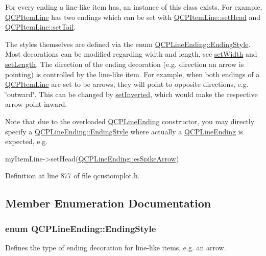  For every ending a line-\/like item has, an instance of this class exists. For example, \hyperlink{class_q_c_p_item_line}{Q\+C\+P\+Item\+Line} has two endings which can be set with \hyperlink{class_q_c_p_item_line_aebf3d687114d584e0459db6759e2c3c3}{Q\+C\+P\+Item\+Line\+::set\+Head} and \hyperlink{class_q_c_p_item_line_ac264222c3297a7efe33df9345c811a5f}{Q\+C\+P\+Item\+Line\+::set\+Tail}.

The styles themselves are defined via the enum \hyperlink{class_q_c_p_line_ending_a5ef16e6876b4b74959c7261d8d4c2cd5}{Q\+C\+P\+Line\+Ending\+::\+Ending\+Style}. Most decorations can be modified regarding width and length, see \hyperlink{class_q_c_p_line_ending_a26dc020ea985a72cc25881ce2115e34e}{set\+Width} and \hyperlink{class_q_c_p_line_ending_ae36fa01763751cd64b7f56c3507e935a}{set\+Length}. The direction of the ending decoration (e.\+g. direction an arrow is pointing) is controlled by the line-\/like item. For example, when both endings of a \hyperlink{class_q_c_p_item_line}{Q\+C\+P\+Item\+Line} are set to be arrows, they will point to opposite directions, e.\+g. \char`\"{}outward\char`\"{}. This can be changed by \hyperlink{class_q_c_p_line_ending_a580e4e2360b35ebb8d68f3494aa2335d}{set\+Inverted}, which would make the respective arrow point inward.

Note that due to the overloaded \hyperlink{class_q_c_p_line_ending}{Q\+C\+P\+Line\+Ending} constructor, you may directly specify a \hyperlink{class_q_c_p_line_ending_a5ef16e6876b4b74959c7261d8d4c2cd5}{Q\+C\+P\+Line\+Ending\+::\+Ending\+Style} where actually a \hyperlink{class_q_c_p_line_ending}{Q\+C\+P\+Line\+Ending} is expected, e.\+g.
\begin{DoxyCode}
myItemLine->setHead(\hyperlink{class_q_c_p_line_ending_a5ef16e6876b4b74959c7261d8d4c2cd5ab9964d0d03f812d1e79de15edbeb2cbf}{QCPLineEnding::esSpikeArrow}) 
\end{DoxyCode}
 

Definition at line 877 of file qcustomplot.\+h.



\subsection{Member Enumeration Documentation}
\subsubsection[{\texorpdfstring{Ending\+Style}{EndingStyle}}]{\setlength{\rightskip}{0pt plus 5cm}enum {\bf Q\+C\+P\+Line\+Ending\+::\+Ending\+Style}}\hypertarget{class_q_c_p_line_ending_a5ef16e6876b4b74959c7261d8d4c2cd5}{}\label{class_q_c_p_line_ending_a5ef16e6876b4b74959c7261d8d4c2cd5}
Defines the type of ending decoration for line-\/like items, e.\+g. an arrow.



